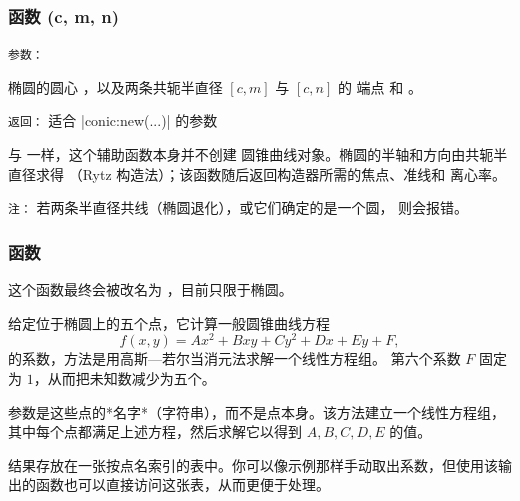 \subsubsection{函数 (c, m, n)}
\label{ssub:function_el_conjugate}

\texttt{参数：}

椭圆的圆心 ，以及两条共轭半直径 $[c, m]$ 与 $[c, n]$ 的
端点  和 。

\medskip
\texttt{返回：} 适合 |conic:new(...)| 的参数

与  一样，这个辅助函数本身并不创建
圆锥曲线对象。椭圆的半轴和方向由共轭半直径求得
（Rytz 构造法）；该函数随后返回构造器所需的焦点、准线和
离心率。

\medskip
\texttt{注：} 若两条半直径共线（椭圆退化），或它们确定的是一个圆，
则会报错。

\begin{tkzexample}[latex= .4\textwidth]
\begin{center}
\end{center}
\end{tkzexample}

\subsubsection{函数 }
\label{ssub:search_ellipse}

这个函数最终会被改名为 ，目前只限于椭圆。

给定位于椭圆上的五个点，它计算一般圆锥曲线方程
\[
f(x, y) = Ax^2 + Bxy + Cy^2 + Dx + Ey + F,
\]
的系数，方法是用高斯—若尔当消元法求解一个线性方程组。
第六个系数 \( F \) 固定为 \( 1 \)，从而把未知数减少为五个。

参数是这些点的*名字*（字符串），而不是点本身。该方法建立一个线性方程组，其中每个点都满足上述方程，然后求解它以得到 \( A, B, C, D, E \) 的值。

结果存放在一张按点名索引的表中。你可以像示例那样手动取出系数，但使用该输出的函数也可以直接访问这张表，从而更便于处理。

